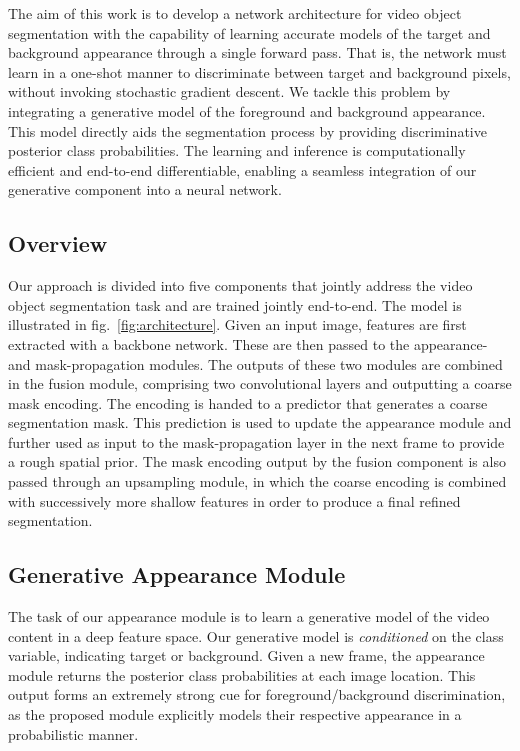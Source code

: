 \documentclass[10pt,twocolumn,letterpaper]{article}
\begin{document}
The aim of this work is to develop a network architecture for video object segmentation with the capability of learning accurate models of the target and background appearance through a single forward pass. That is, the network must learn in a one-shot manner to discriminate between target and background pixels, without invoking stochastic gradient descent. We tackle this problem by integrating a generative model of the foreground and background appearance. This model directly aids the segmentation process by providing discriminative posterior class probabilities. The learning and inference is computationally efficient and end-to-end differentiable, enabling a seamless integration of our generative component into a neural network.

\subsection{Overview}
Our approach is divided into five components that jointly address the video object segmentation task and are trained jointly end-to-end. The model is illustrated in fig.~\ref{fig:architecture}. Given an input image, features are first extracted with a backbone network. These are then passed to the appearance- and mask-propagation modules. The outputs of these two modules are combined in the fusion module, comprising two convolutional layers and outputting a coarse mask encoding. The encoding is handed to a predictor that generates a coarse segmentation mask. This prediction is used to update the appearance module and further used as input to the mask-propagation layer in the next frame to provide a rough spatial prior. The mask encoding output by the fusion component is also passed through an upsampling module, in which the coarse encoding is combined with successively more shallow features in order to produce a final refined segmentation.

\subsection{Generative Appearance Module}
\label{sec:appearance-module}
The task of our appearance module is to learn a generative model of the video content in a deep feature space. Our generative model is \emph{conditioned} on the class variable, indicating target or background. Given a new frame, the appearance module returns the posterior class probabilities at each image location. This output forms an extremely strong cue for foreground/background discrimination, as the proposed module explicitly models their respective appearance in a probabilistic manner.
\end{document}
